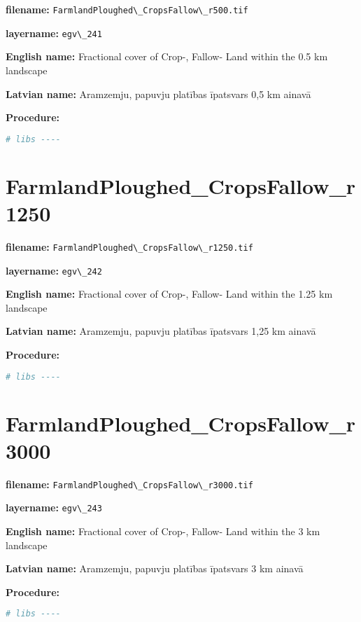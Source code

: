\documentclass[
]{book}
\newcommand{\passthrough}[1]{#1}
\begin{document}
\textbf{filename:} \passthrough{\lstinline!FarmlandPloughed\_CropsFallow\_r500.tif!}

\textbf{layername:} \passthrough{\lstinline!egv\_241!}

\textbf{English name:} Fractional cover of Crop-, Fallow- Land within the 0.5 km landscape

\textbf{Latvian name:} Aramzemju, papuvju platības īpatsvars 0,5 km ainavā

\textbf{Procedure:}

\begin{lstlisting}[language=R]
# libs ----
\end{lstlisting}

\section{FarmlandPloughed\_CropsFallow\_r1250}\label{ch06.242}

\textbf{filename:} \passthrough{\lstinline!FarmlandPloughed\_CropsFallow\_r1250.tif!}

\textbf{layername:} \passthrough{\lstinline!egv\_242!}

\textbf{English name:} Fractional cover of Crop-, Fallow- Land within the 1.25 km landscape

\textbf{Latvian name:} Aramzemju, papuvju platības īpatsvars 1,25 km ainavā

\textbf{Procedure:}

\begin{lstlisting}[language=R]
# libs ----
\end{lstlisting}

\section{FarmlandPloughed\_CropsFallow\_r3000}\label{ch06.243}

\textbf{filename:} \passthrough{\lstinline!FarmlandPloughed\_CropsFallow\_r3000.tif!}

\textbf{layername:} \passthrough{\lstinline!egv\_243!}

\textbf{English name:} Fractional cover of Crop-, Fallow- Land within the 3 km landscape

\textbf{Latvian name:} Aramzemju, papuvju platības īpatsvars 3 km ainavā

\textbf{Procedure:}

\begin{lstlisting}[language=R]
# libs ----
\end{lstlisting}
\end{document}
